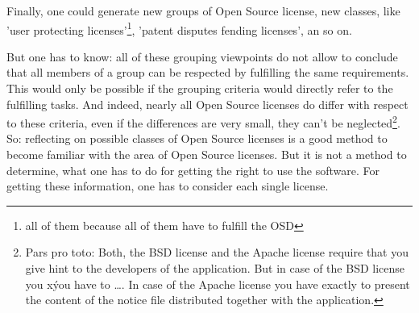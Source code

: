 
Finally, one could generate new groups of Open Source license, new classes, like
'user protecting licenses'\footnote{all of them because all of them have to
fulfill the OSD}, 'patent disputes fending licenses', an so on.

But one has to know: all of these grouping viewpoints do not allow to conclude
that all members of a group can be respected by fulfilling the same
requirements. This would only be possible if the grouping criteria would
directly refer to the fulfilling tasks. And indeed, nearly all Open Source
licenses do differ with respect to these criteria, even if the differences are
very small, they can't be neglected\footnote{Pars pro toto: Both, the BSD
license and the Apache license require that you give hint to the developers of
the application. But in case of the BSD license you xýou have to \ldots. In case
of the Apache license you have exactly to present the content of the notice file
distributed together with the application.}. So: reflecting on possible classes
of Open Source licenses is a good method to become familiar with the area of
Open Source licenses. But it is not a method to determine, what one has to do
for getting the right to use the software. For getting these information, one
has to consider each single license.


%
